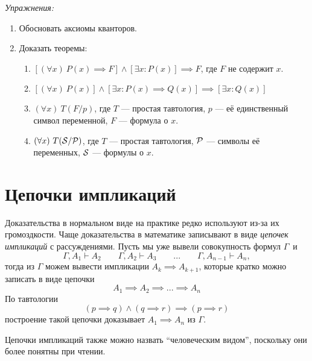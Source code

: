 \vspace{1em}
{\it Упражнения:}
\begin{enumerate}
  \item{}Обосновать аксиомы кванторов.
  \item{}Доказать теоремы:
  \begin{enumerate}
    \item{}$[(\forall x)~P(x)\implies F]\land [\exists x:P(x)]\implies F$,
    где $F$ не содержит $x$.
    \item{}$[(\forall x)~P(x)]\land [\exists x:P(x)\implies Q(x)]
      \implies [\exists x:Q(x)]$
    \item{}$(\forall x)~T(F/p)$, где $T$ --- простая тавтология,
    $p$ --- её единственный символ переменной, $F$ --- формула о $x$.
    \item{}$(\forall x)~T(\mathcal S/\mathcal P)$, где $T$ --- простая тавтология,
    $\mathcal P$ --- символы её переменных, $\mathcal S$ --- формулы о $x$.
  \end{enumerate}
\end{enumerate}

\section{Цепочки импликаций}

Доказательства в нормальном виде на практике редко используют из-за их
громоздкости.
Чаще доказательства в математике записывают в виде {\it цепочек импликаций}
с рассуждениями. Пусть мы уже вывели совокупность формул $\Gamma$~и
\[
  \Gamma,A_1\vdash A_2\qquad \Gamma,A_2\vdash A_3
  \qquad  ... \qquad \Gamma,A_{n-1}\vdash A_{n},
\]
тогда из $\Gamma$ можем вывести импликации
${A_{k}\implies A_{k+1}}$, которые кратко можно записать в виде цепочки
\[
  A_1\implies A_2\implies ...\implies A_{n}
\]
По тавтологии
\[
  (p\implies q)\land (q\implies r)\implies (p\implies r)
\]
построение такой цепочки доказывает $A_1\implies A_{n}$ из $\Gamma$.

Цепочки импликаций также можно назвать ``человеческим видом'',
поскольку они более понятны при чтении.


